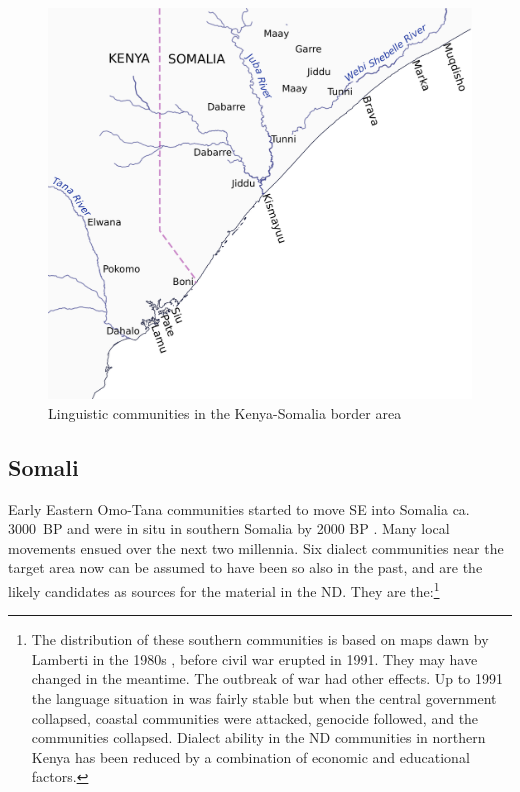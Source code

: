 \documentclass[output=paper,newtxmath,modfonts,nonflat,hidelinks]{langsci/langscibook}
\begin{document}
\begin{figure}
\includegraphics[width=\textwidth]{figures/nurse.pdf}
\caption{Linguistic communities in the Kenya-Somalia border area}
\label{fig:nurse:1}
\end{figure}

\subsection{Somali}\label{sec:nurse:2.2} 

Early Eastern Omo-Tana communities started to move SE into Somalia ca. 3000~BP and were in situ in southern Somalia by 2000 BP \citep{ehret1995}. Many local movements ensued over the next two millennia. Six  dialect communities near the target area now can be assumed to have been so also in the past, and are the likely candidates as sources for the material in the ND. They are the:\footnote{The distribution of these southern  communities is based on maps dawn by Lamberti in the 1980s \citep{Lamberti1983}, before civil war erupted in 1991. They may have changed in the meantime. The outbreak of war had other effects. Up to 1991 the language situation in  was fairly stable but when the central government collapsed, coastal  communities were attacked, genocide followed, and the communities collapsed. Dialect ability in the ND communities in northern Kenya has been reduced by a combination of economic and educational factors.}
\end{document}
